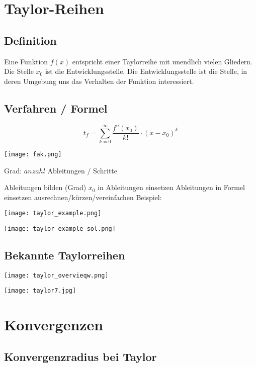 \begin{multicols*}{3}
    \section{Taylor-Reihen}
    \subsection{Definition}
    {Eine Funktion $f(x)$ entspricht einer Taylorreihe mit unendlich vielen Gliedern. Die Stelle $x_0$ ist die Entwicklungsstelle. Die Entwicklungsstelle ist die Stelle, in deren Umgebung uns das Verhalten der Funktion interessiert.}
    \WhiteSpace
    \subsection{Verfahren / Formel}

    \begin{multicols*}{2}

        $$t_f = \sum_{k = 0}^{ \infty }\frac{f^n(x_0)}{k!}\cdot(x-x_0)^k$$

        \columnbreak
        \texttt{[image: fak.png]}

    \end{multicols*}
    {Grad: $anzahl$ Ableitungen / Schritte}

    { Ableitungen bilden (Grad)}
    \WhiteSpace
    { $x_0$ in Ableitungen einsetzen}
    \WhiteSpace
    { Ableitungen in Formel einsetzen}
    \WhiteSpace
    { ausrechnen/kürzen/vereinfachen}
    \WhiteSpace
    {Beispiel:}

    \texttt{[image: taylor\_example.png]}

    \texttt{[image: taylor\_example\_sol.png]}
    \vfill\null
    \columnbreak
    \subsection{Bekannte Taylorreihen}

    { \texttt{[image: taylor\_overvieqw.png]} }
   
    { \texttt{[image: taylor7.jpg]} }

    \vfill\null
    \columnbreak

   
    \section{Konvergenzen}
    \subsection{Konvergenzradius bei Taylor}


\end{multicols*}
